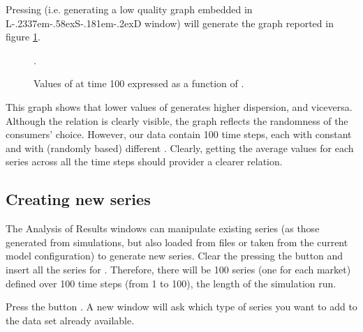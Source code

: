 \documentclass [11pt,a4paper] {book}
\def\LsD{{L\kern-.2337em\lower-.58ex\hbox{S}\kern-.181em\lower-.2ex\hbox{D}}\xspace}
\begin{document}
Pressing  (i.e. generating a low quality graph embedded in \LsD window) will generate the graph reported in figure \ref{fig:alpha}.

\begin{figure}[ht]
  \centering
  \caption{\small Values of  at time 100 expressed as a function of .}.
   \label{fig:alpha}
\end{figure}


This graph shows that lower values of  generates higher dispersion, and viceversa. Although the relation is clearly visible, the graph reflects the randomness of the consumers' choice. However, our data contain 100 time steps, each with constant  and with (randomly based) different . Clearly, getting the average values for each series across all the time steps should provider a clearer relation.

\subsection{Creating new series}

The Analysis of Results windows can manipulate existing series (as those generated from simulations, but also loaded from files or taken from the current model configuration) to generate new series. Clear the  pressing the button  and insert all the series for . Therefore, there will be 100 series (one for each market) defined over 100 time steps (from 1 to 100), the length of the simulation run.

Press the button . A new window will ask which type of series you want to add to the data set already available. 
\end{document}
